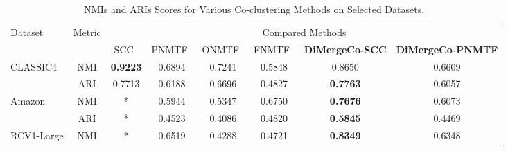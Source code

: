 \documentclass[journal]{IEEEtran}
\theoremstyle{definition}
\theoremstyle{remark} %
\renewcommand{\cite}[1]{~\autocite{#1}}
\begin{document}
\begin{table}[htbp]
    \centering
    \caption{NMIs and ARIs Scores for Various Co-clustering Methods on Selected Datasets.}
    \label{tab:evaluation-metrics}
    \begin{threeparttable}
        \begin{tabular}{@{} l c cccccc @{}}
            \toprule
            \multirow{2}{*}{Dataset}    & \multirow{2}{*}{Metric} & \multicolumn{6}{c}{Compared Methods}                                                                                                                                                                                                             \\
            \cmidrule{3-8}
                                        &                         & SCC\cite{dhillon2001CoclusteringDocumentsWords} & PNMTF\cite{chen2023ParallelNonNegativeMatrix} & ONMTF\cite{ding2006OrthogonalNonnegativeMatrix} & FNMTF\cite{kim2011FastNonnegativeMatrix} & \textbf{DiMergeCo-SCC} & \textbf{DiMergeCo-PNMTF} \\
            \midrule
            \multirow{2}{*}{CLASSIC4}   & NMI                     & \textbf{0.9223}                                 & 0.6894                                        & 0.7241                                          & 0.5848                                   & 0.8650                 & 0.6609                   \\
                                        & ARI                     & 0.7713                                          & 0.6188                                        & 0.6696                                          & 0.4827                                   & \textbf{0.7763}        & 0.6057                   \\
            \multirow{2}{*}{Amazon}     & NMI                     & *                                               & 0.5944                                        & 0.5347                                          & 0.6750                                   & \textbf{0.7676}        & 0.6073                   \\
                                        & ARI                     & *                                               & 0.4523                                        & 0.4086                                          & 0.4820                                   & \textbf{0.5845}        & 0.4469                   \\
            \multirow{2}{*}{RCV1-Large} & NMI                     & *                                               & 0.6519                                        & 0.4288                                          & 0.4721                                   & \textbf{0.8349}        & 0.6348                   \\

\end{tabular}
\end{threeparttable}
\end{table}
\end{document}
